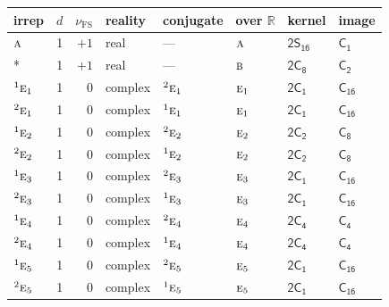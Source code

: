 \documentclass[10pt,a4paper]{article}
\numberwithin{equation}{section}
\newcommand{\grp}[1]{\mathsf{#1}}
\newcommand{\irr}[1]{\text{\normalfont\scshape #1}}
\newcommand{\conjpair}[1]{{}^{#1}}
\newcommand{\detbox}[1]{{\setlength{\fboxsep}{1pt}\fbox{#1}}}
\newcommand{\fsind}{\nu_{\mathrm{FS}}}
\begin{document}
{\small\renewcommand{\arraystretch}{1.25}\setlength{\tabcolsep}{4pt}\begin{longtable}{@{}lrrlllll@{}}\toprule
irrep & $d$ & $\fsind$ & reality & conjugate & over $\mathbb{R}$ & kernel & image\\\midrule\endhead
\bottomrule\endfoot\endlastfoot
$\irr{a}$ & 1 & $+1$ & real & --- & $\irr{a}$ & \href{2S16.pdf}{$\grp{2S_{16}}$} & \href{../../../rotation/data/pdf/C1.pdf}{$\grp{C_{1}}$}\\*
\detbox{$\irr{b}$} & 1 & $+1$ & real & --- & $\irr{b}$ & \href{2C8.pdf}{$\grp{2C_{8}}$} & \href{../../../rotation/data/pdf/C2.pdf}{$\grp{C_{2}}$}\\
$\conjpair{1}\irr{e}_{1}$ & 1 & $0$ & complex & $\conjpair{2}\irr{e}_{1}$ & $\irr{e}_{1}$ & \href{2C1.pdf}{$\grp{2C_{1}}$} & $\grp{C_{16}}$\\
$\conjpair{2}\irr{e}_{1}$ & 1 & $0$ & complex & $\conjpair{1}\irr{e}_{1}$ & $\irr{e}_{1}$ & \href{2C1.pdf}{$\grp{2C_{1}}$} & $\grp{C_{16}}$\\
$\conjpair{1}\irr{e}_{2}$ & 1 & $0$ & complex & $\conjpair{2}\irr{e}_{2}$ & $\irr{e}_{2}$ & \href{2C2.pdf}{$\grp{2C_{2}}$} & \href{../../../rotation/data/pdf/C8.pdf}{$\grp{C_{8}}$}\\
$\conjpair{2}\irr{e}_{2}$ & 1 & $0$ & complex & $\conjpair{1}\irr{e}_{2}$ & $\irr{e}_{2}$ & \href{2C2.pdf}{$\grp{2C_{2}}$} & \href{../../../rotation/data/pdf/C8.pdf}{$\grp{C_{8}}$}\\
$\conjpair{1}\irr{e}_{3}$ & 1 & $0$ & complex & $\conjpair{2}\irr{e}_{3}$ & $\irr{e}_{3}$ & \href{2C1.pdf}{$\grp{2C_{1}}$} & $\grp{C_{16}}$\\
$\conjpair{2}\irr{e}_{3}$ & 1 & $0$ & complex & $\conjpair{1}\irr{e}_{3}$ & $\irr{e}_{3}$ & \href{2C1.pdf}{$\grp{2C_{1}}$} & $\grp{C_{16}}$\\
$\conjpair{1}\irr{e}_{4}$ & 1 & $0$ & complex & $\conjpair{2}\irr{e}_{4}$ & $\irr{e}_{4}$ & \href{2C4.pdf}{$\grp{2C_{4}}$} & \href{../../../rotation/data/pdf/C4.pdf}{$\grp{C_{4}}$}\\
$\conjpair{2}\irr{e}_{4}$ & 1 & $0$ & complex & $\conjpair{1}\irr{e}_{4}$ & $\irr{e}_{4}$ & \href{2C4.pdf}{$\grp{2C_{4}}$} & \href{../../../rotation/data/pdf/C4.pdf}{$\grp{C_{4}}$}\\
$\conjpair{1}\irr{e}_{5}$ & 1 & $0$ & complex & $\conjpair{2}\irr{e}_{5}$ & $\irr{e}_{5}$ & \href{2C1.pdf}{$\grp{2C_{1}}$} & $\grp{C_{16}}$\\
$\conjpair{2}\irr{e}_{5}$ & 1 & $0$ & complex & $\conjpair{1}\irr{e}_{5}$ & $\irr{e}_{5}$ & \href{2C1.pdf}{$\grp{2C_{1}}$} & $\grp{C_{16}}$\\

\end{longtable}}
\end{document}
